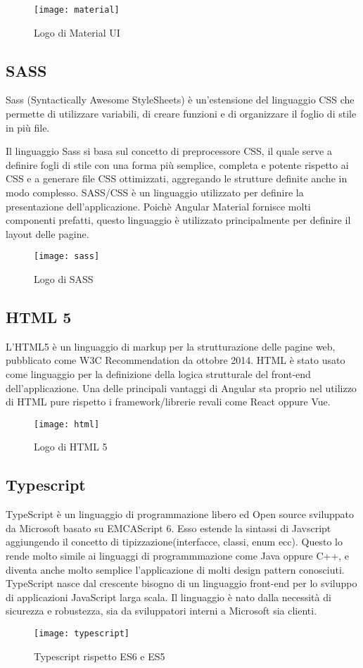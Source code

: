 \begin{figure}[!h] 
	\centering 
	\texttt{[image: material]}
	\caption{Logo di Material UI} 
\end{figure}
\subsection{SASS} Sass (Syntactically Awesome StyleSheets) è un'estensione del linguaggio CSS che permette di utilizzare variabili, di creare funzioni e di organizzare il foglio di stile in più file.

Il linguaggio Sass si basa sul concetto di preprocessore CSS, il quale serve a definire fogli di stile con una forma più semplice, completa e potente rispetto ai CSS e a generare file CSS ottimizzati, aggregando le strutture definite anche in modo complesso. SASS/CSS è un linguaggio utilizzato per definire la presentazione dell'applicazione. Poichè Angular Material fornisce molti componenti prefatti, questo linguaggio è utilizzato principalmente per definire il layout delle pagine. 
\begin{figure}[!h] 
	\centering 
	\texttt{[image: sass]}
	\caption{Logo di SASS}
\end{figure}

\subsection{HTML 5} L'HTML5 è un linguaggio di markup per la strutturazione delle pagine web, pubblicato come W3C Recommendation da ottobre 2014. HTML è stato usato come linguaggio per la definizione della logica strutturale del
front-end dell’applicazione. Una delle principali vantaggi di Angular sta proprio nel utilizzo di HTML pure rispetto i framework/librerie revali come React oppure Vue. 
\begin{figure}[!h] 
	\centering 
	\texttt{[image: html]} 
	\caption{Logo di HTML 5}
\end{figure}


\subsection{Typescript} TypeScript è un linguaggio di programmazione libero ed Open source sviluppato da Microsoft basato su EMCAScript 6. Esso estende la sintassi di Javscript aggiungendo il concetto di tipizzazione(interfacce, classi, enum ecc). Questo lo rende molto simile ai linguaggi di programmmazione come Java oppure C++, e diventa anche molto semplice l'applicazione di molti design pattern conosciuti. TypeScript nasce dal crescente bisogno di un linguaggio front-end per lo sviluppo di applicazioni JavaScript larga scala. Il linguaggio è nato dalla necessità di sicurezza e robustezza, sia da sviluppatori interni a Microsoft sia clienti. 
\begin{figure}[!h] 
	\centering 
	\texttt{[image: typescript]} 
	\caption{Typescript rispetto ES6 e ES5}
\end{figure}

